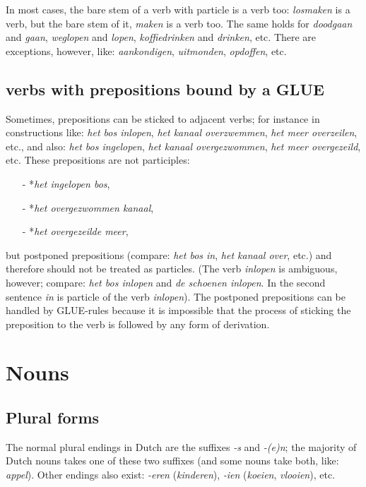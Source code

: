 In most cases, the bare stem of a verb with particle is a verb too: 
{\em losmaken} is a verb, but the bare stem of it, {\em maken} is a verb too.
The same holds for {\em doodgaan} and {\em gaan}, {\em weglopen} and 
{\em lopen}, {\em koffiedrinken} and {\em drinken}, etc. There are exceptions,
however, like: {\em aankondigen}, {\em uitmonden}, {\em opdoffen}, etc.

\subsection{verbs with prepositions bound by a GLUE}

Sometimes, prepositions can be sticked to adjacent verbs; for instance in
constructions like: {\em het bos inlopen}, {\em het kanaal overzwemmen},
{\em het meer overzeilen}, etc., and also: {\em het bos ingelopen}, 
{\em het kanaal overgezwommen}, {\em het meer overgezeild}, etc.
These prepositions are not participles:
\begin{itemize}
   \item [-] *{\em het ingelopen bos},
   \item [-] *{\em het overgezwommen kanaal},
   \item [-] *{\em het overgezeilde meer},
\end{itemize}
but postponed prepositions (compare: {\em het bos in},
{\em het kanaal over}, etc.) and therefore should not be treated as particles.
(The verb {\em inlopen} is ambiguous, however; compare: {\em het bos inlopen}
and {\em de schoenen inlopen}. In the second sentence {\em in} is particle of
the verb {\em inlopen}). The postponed prepositions can be handled by
GLUE-rules because it is impossible that the process of sticking the 
preposition to the verb is followed by any form of derivation.

\newpage

\section{Nouns}

\subsection{Plural forms}

The normal plural endings in Dutch are the suffixes {\em -s} and {\em -(e)n}; 
the majority of Dutch nouns takes one of these two suffixes (and some nouns take
both, like: {\em appel}). Other endings also exist: {\em -eren} 
({\em kinderen}), {\em -ien} ({\em koeien}, {\em vlooien}), etc.

